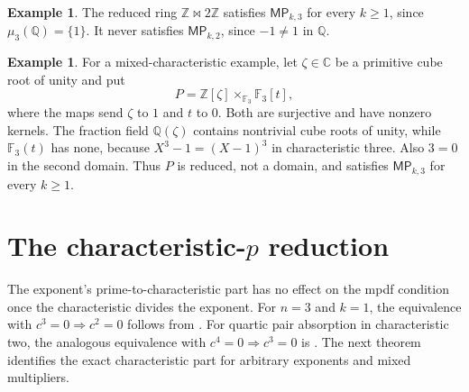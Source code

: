 \documentclass[11pt,a4paper]{amsart}
\theoremstyle{definition}
\newtheorem{example}[theorem]{Example}
\theoremstyle{remark}
\newcommand{\MP}[2]{\mathsf{MP}_{#1,#2}}
\numberwithin{equation}{section}
\begin{document}
\begin{example}
The reduced ring $\mathbb Z\bowtie2\mathbb Z$ satisfies
$\MP{k}{3}$ for every $k\ge1$, since $\mu_3(\mathbb Q)=\{1\}$.
It never satisfies $\MP{k}{2}$, since $-1\ne1$ in $\mathbb Q$.
\end{example}

\begin{example}\label{ex:domain-pullback}
For a mixed-characteristic example, let $\zeta\in\mathbb C$ be a
primitive cube root of unity and put
\[
 P=\mathbb Z[\zeta]\times_{\mathbb F_3}\mathbb F_3[t],
\]
where the maps send $\zeta$ to $1$ and $t$ to $0$.  Both are
surjective and have nonzero kernels.  The fraction field
$\mathbb Q(\zeta)$ contains nontrivial cube roots of unity, while
$\mathbb F_3(t)$ has none, because $X^3-1=(X-1)^3$ in
characteristic three.  Also $3=0$ in the second domain.
Thus $P$ is reduced, not a domain, and satisfies
$\MP{k}{3}$ for every $k\ge1$.
\end{example}

\section{The characteristic-\texorpdfstring{$p$}{p} reduction}\label{sec:charp}

The exponent's prime-to-characteristic part has no effect on the mpdf
condition once the characteristic divides the exponent.
For $n=3$ and $k=1$, the equivalence with
$c^3=0\Rightarrow c^2=0$ follows from
\cite[Proposition~2.4 and Theorem~2.6]{Far}. For quartic pair
absorption in characteristic two, the analogous equivalence with
$c^4=0\Rightarrow c^3=0$ is \cite[Proposition~2.18]{TAHA}.
The next theorem identifies the exact characteristic part for
arbitrary exponents and mixed multipliers.
\end{document}
